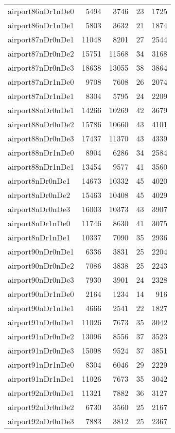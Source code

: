 \begin{tabular}{lrrrr}
airport86nDr1nDe0 & 5494 & 3746 & 23 & 1725 \\
airport86nDr1nDe1 & 5803 & 3632 & 21 & 1874 \\
airport87nDr0nDe1 & 11048 & 8201 & 27 & 2544 \\
airport87nDr0nDe2 & 15751 & 11568 & 34 & 3168 \\
airport87nDr0nDe3 & 18638 & 13055 & 38 & 3864 \\
airport87nDr1nDe0 & 9708 & 7608 & 26 & 2074 \\
airport87nDr1nDe1 & 8304 & 5795 & 24 & 2209 \\
airport88nDr0nDe1 & 14266 & 10269 & 42 & 3679 \\
airport88nDr0nDe2 & 15786 & 10660 & 43 & 4101 \\
airport88nDr0nDe3 & 17437 & 11370 & 43 & 4339 \\
airport88nDr1nDe0 & 8904 & 6286 & 34 & 2584 \\
airport88nDr1nDe1 & 13454 & 9577 & 41 & 3560 \\
airport8nDr0nDe1 & 14673 & 10332 & 45 & 4020 \\
airport8nDr0nDe2 & 15463 & 10408 & 45 & 4029 \\
airport8nDr0nDe3 & 16003 & 10373 & 43 & 3907 \\
airport8nDr1nDe0 & 11746 & 8630 & 41 & 3075 \\
airport8nDr1nDe1 & 10337 & 7090 & 35 & 2936 \\
airport90nDr0nDe1 & 6336 & 3831 & 25 & 2204 \\
airport90nDr0nDe2 & 7086 & 3838 & 25 & 2243 \\
airport90nDr0nDe3 & 7930 & 3901 & 24 & 2328 \\
airport90nDr1nDe0 & 2164 & 1234 & 14 & 916 \\
airport90nDr1nDe1 & 4666 & 2541 & 22 & 1827 \\
airport91nDr0nDe1 & 11026 & 7673 & 35 & 3042 \\
airport91nDr0nDe2 & 13096 & 8556 & 37 & 3523 \\
airport91nDr0nDe3 & 15098 & 9524 & 37 & 3851 \\
airport91nDr1nDe0 & 8304 & 6046 & 29 & 2229 \\
airport91nDr1nDe1 & 11026 & 7673 & 35 & 3042 \\
airport92nDr0nDe1 & 11321 & 7882 & 36 & 3127 \\
airport92nDr0nDe2 & 6730 & 3560 & 25 & 2167 \\
airport92nDr0nDe3 & 7883 & 3812 & 25 & 2367 \\

\end{tabular}
